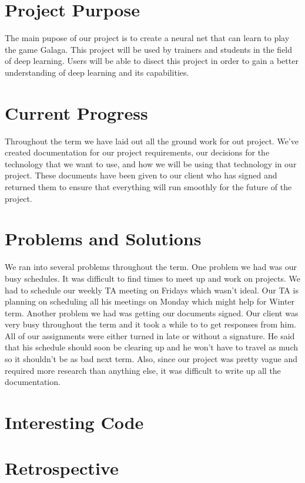 \documentclass[onecolumn, draftclsnofoot,10pt, compsoc]{IEEEtran}
\begin{document}
\newpage
{}
\tableofcontents

\section{Project Purpose}
The main pupose of our project is to create a neural net that can learn to play the game Galaga.
This project will be used by trainers and students in the field of deep learning.
Users will be able to disect this project in order to gain a better understanding of deep learning and its capabilities.

\section{Current Progress}
Throughout the term we have laid out all the ground work for out project.
We've created documentation for our project requirements, our decisions for the technology that we want to use, and how we will be using that technology in our project.
These documents have been given to our client who has signed and returned them to ensure that everything will run smoothly for the future of the project.

\section{Problems and Solutions}
We ran into several problems throughout the term.
One problem we had was our busy schedules.
It was difficult to find times to meet up and work on projects.
We had to schedule our weekly TA meeting on Fridays which wasn't ideal.
Our TA is planning on scheduling all his meetings on Monday which might help for Winter term.
Another problem we had was getting our documents signed.
Our client was very busy throughout the term and it took a while to to get responses from him.
All of our assignments were either turned in late or without a signature.
He said that his schedule should soon be clearing up and he won't have to travel as much so it shouldn't be as bad next term.
Also, since our project was pretty vague and required more research than anything else, it was difficult to write up all the documentation.

\section{Interesting Code}
\section{Retrospective}
\end{document}
